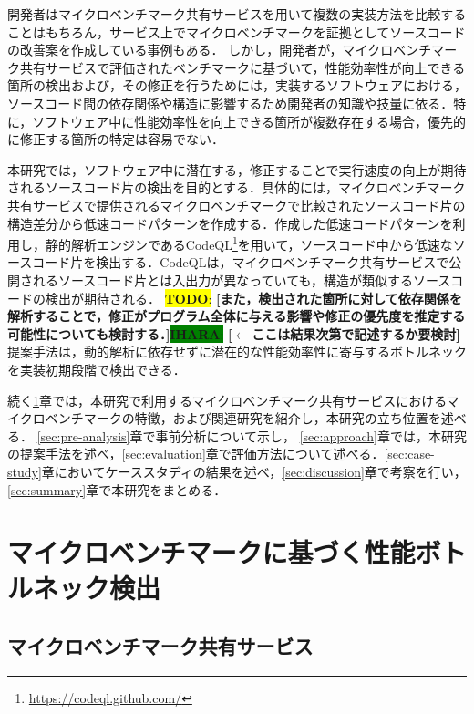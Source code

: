 \documentclass[submit,techrep,noauthor]{ipsj}
\newcommand{\todo}[1]{\colorbox{yellow}{{\bf TODO}:}{\color{red} {\textbf{[#1]}}}}
\newcommand{\ihara}[1]{\colorbox{green}{{\bf IHARA}:}{\color{blue} {\textbf{[#1]}}}}
\begin{document}
開発者はマイクロベンチマーク共有サービスを用いて複数の実装方法を比較することはもちろん，サービス上でマイクロベンチマークを証拠としてソースコードの改善案を作成している事例もある\cite{saiki}．
しかし，開発者が，マイクロベンチマーク共有サービスで評価されたベンチマークに基づいて，性能効率性が向上できる箇所の検出および，その修正を行うためには，実装するソフトウェアにおける，ソースコード間の依存関係や構造に影響するため開発者の知識や技量に依る．特に，ソフトウェア中に性能効率性を向上できる箇所が複数存在する場合，優先的に修正する箇所の特定は容易でない．

本研究では，ソフトウェア中に潜在する，修正することで実行速度の向上が期待されるソースコード片の検出を目的とする．具体的には，マイクロベンチマーク共有サービスで提供されるマイクロベンチマークで比較されたソースコード片の構造差分から低速コードパターンを作成する．作成した低速コードパターンを利用し，静的解析エンジンであるCodeQL\footnote{\url{https://codeql.github.com/}}\cite{ql}を用いて，ソースコード中から低速なソースコード片を検出する．CodeQLは，マイクロベンチマーク共有サービスで公開されるソースコード片とは入出力が異なっていても，構造が類似するソースコードの検出が期待される．
\todo{また，検出された箇所に対して依存関係を解析することで，修正がプログラム全体に与える影響や修正の優先度を推定する可能性についても検討する．}\ihara{$\leftarrow$ここは結果次第で記述するか要検討}提案手法は，動的解析に依存せずに潜在的な性能効率性に寄与するボトルネックを実装初期段階で検出できる．

続く\ref{sec:background}章では，本研究で利用するマイクロベンチマーク共有サービスにおけるマイクロベンチマークの特徴，および関連研究を紹介し，本研究の立ち位置を述べる． \ref{sec:pre-analysis}章で事前分析について示し， \ref{sec:approach}章では，本研究の提案手法を述べ，\ref{sec:evaluation}章で評価方法について述べる．\ref{sec:case-study}章においてケーススタディの結果を述べ，\ref{sec:discussion}章で考察を行い，\ref{sec:summary}章で本研究をまとめる． 


\section{マイクロベンチマークに基づく性能ボトルネック検出}
\label{sec:background}

\subsection{マイクロベンチマーク共有サービス}
\end{document}
